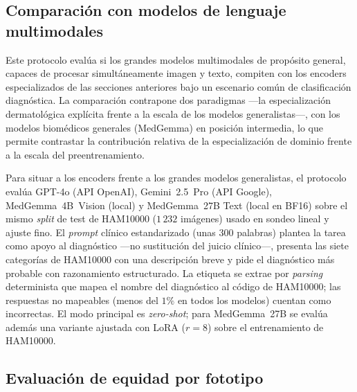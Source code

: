 \subsection{Comparación con modelos de lenguaje multimodales}
\label{sec:llm}

Este protocolo evalúa si los grandes modelos multimodales de
propósito general, capaces de procesar simultáneamente imagen y
texto, compiten con los encoders especializados de las secciones
anteriores bajo un escenario común de clasificación diagnóstica. La
comparación contrapone dos paradigmas ---la especialización
dermatológica explícita frente a la escala de los modelos
generalistas---, con los modelos biomédicos generales (MedGemma) en
posición intermedia, lo que permite contrastar la contribución
relativa de la especialización de dominio frente a la escala del
preentrenamiento.

Para situar a los encoders frente a los grandes modelos
generalistas, el protocolo evalúa GPT-4o (API OpenAI),
Gemini~2.5~Pro (API Google), MedGemma~4B~Vision (local) y
MedGemma~27B Text (local en BF16) sobre el mismo \emph{split} de
test de HAM10000 ($1\,232$ imágenes) usado en sondeo lineal y
ajuste fino. El \emph{prompt} clínico estandarizado (unas $300$
palabras) plantea la tarea como apoyo al diagnóstico —no
sustitución del juicio clínico—, presenta las siete categorías de
HAM10000 con una descripción breve y pide el diagnóstico más
probable con razonamiento estructurado. La etiqueta se extrae por
\emph{parsing} determinista que mapea el nombre del diagnóstico al
código de HAM10000; las respuestas no mapeables (menos del $1\%$
en todos los modelos) cuentan como incorrectas. El modo principal es
\emph{zero-shot}; para MedGemma~27B se evalúa además una variante
ajustada con LoRA ($r = 8$) sobre el entrenamiento de HAM10000.

\subsection{Evaluación de equidad por fototipo}
\label{sec:equidad}

